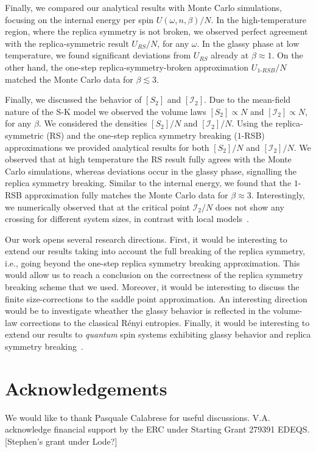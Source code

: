 \documentclass[twocolumn,superscriptaddress,prb,10pt]{revtex4-1}
\begin{document}
Finally, we compared our analytical results with Monte Carlo simulations, focusing on the 
internal energy per spin $U(\omega,n,\beta)/N$. In the high-temperature region, where the 
replica symmetry is not broken, we observed perfect agreement with the replica-symmetric 
result $U_{RS}/N$, for any $\omega$. In the glassy phase at low temperature, we found 
significant deviations from $U_{RS}$ already at $\beta\approx 1$. On the other hand,  
the one-step replica-symmetry-broken approximation $U_{1\textrm{-}RSB}/N$ matched the 
Monte Carlo data for $\beta\lesssim 3$. 

Finally, we discussed the behavior of $[S_2]$ and $[{\mathcal I}_2]$. Due to the mean-field 
nature of the S-K model we observed the volume laws $[S_2]\propto N$ and 
$[{\mathcal I}_2]\propto N$, for any $\beta$. We considered the densities 
$[S_2]/N$ and $[{\mathcal I}_2]/N$. Using the replica-symmetric (RS) and the one-step 
replica symmetry breaking ($1$-RSB) approximations we provided analytical results for 
both $[S_2]/N$ and $[{\mathcal I}_2]/N$. We observed that at high temperature the 
RS result fully agrees with the Monte Carlo simulations, whereas deviations occur in the 
glassy phase, signalling the replica symmetry breaking. Similar to the internal energy, 
we found that the $1$-RSB approximation fully matches the Monte Carlo data for $\beta\approx 3$.
Interestingly, we numerically observed that at the critical point ${\mathcal I}_2/N$ 
does not show any crossing for different system sizes, in contrast with local 
models~\cite{jaconis-2013}.

Our work opens several research directions. First, it would be interesting to extend our 
results taking into account the full breaking of the replica symmetry, i.e., going beyond 
the one-step replica symmetry breaking approximation. This would allow us to reach a conclusion 
on the correctness of the replica symmetry breaking scheme that we used. Moreover, it 
would be interesting to discuss the finite size-corrections to the saddle 
point approximation. An interesting direction would be to investigate wheather the 
glassy behavior is reflected in the volume-law corrections to the classical R\'enyi 
entropies. Finally, it would be interesting to extend our results to {\it quantum} spin 
systems exhibiting glassy behavior and replica symmetry breaking~\cite{read-1995,
andreanov-2012}. 

\section{Acknowledgements}
We would like to thank Pasquale Calabrese for useful discussions. V.A.  acknowledge 
financial support by the ERC under Starting Grant 279391 EDEQS. 
[Stephen's grant under Lode?]
\end{document}
